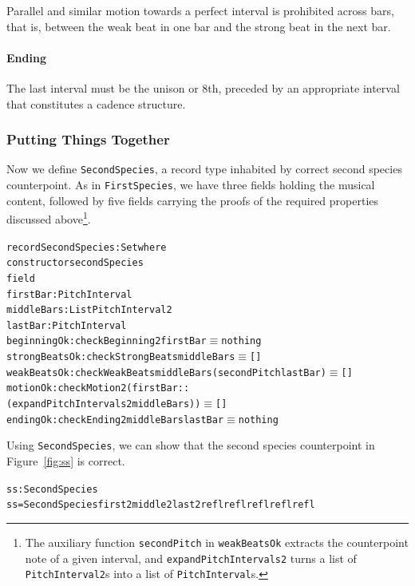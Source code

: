 Parallel and similar motion towards a perfect interval is prohibited
across bars, that is, between the weak beat in one bar and the
strong beat in the next bar.

\paragraph{Ending}

The last interval must be the unison or 8th, preceded by an
appropriate interval that constitutes a cadence structure.

\subsubsection{Putting Things Together}

Now we define \texttt{SecondSpecies}, a record type inhabited by
correct second species counterpoint.
As in \texttt{FirstSpecies}, we have three fields holding the musical
content, followed by five fields carrying the proofs of the required
properties discussed above\footnote{
  The auxiliary function \texttt{secondPitch} in \texttt{weakBeatsOk}
  extracts the counterpoint note of a given interval, and
  \texttt{expandPitchIntervals2} turns a list of \texttt{PitchInterval2}s
  into a list of \texttt{PitchInterval}s.
}.

\begin{alltt}
record SecondSpecies : Set where
  constructor secondSpecies
  field
    firstBar      : PitchInterval 
    middleBars    : List PitchInterval2
    lastBar       : PitchInterval 
    beginningOk   : checkBeginning2 firstBar \(\equiv\) nothing
    strongBeatsOk : checkStrongBeats middleBars \(\equiv\) []
    weakBeatsOk   : checkWeakBeats middleBars (secondPitch lastBar) \(\equiv\) []
    motionOk      : checkMotion2 (firstBar ::
                                  (expandPitchIntervals2 middleBars)) \(\equiv\) []
    endingOk      : checkEnding2 middleBars lastBar \(\equiv\) nothing
\end{alltt}

Using \texttt{SecondSpecies}, we can show that the second species
counterpoint in Figure~\ref{fig:ss} is correct.

\begin{alltt}
ss : SecondSpecies
ss = SecondSpecies first2 middle2 last2 refl refl refl refl refl
\end{alltt}

